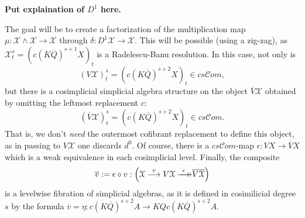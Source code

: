 \documentclass[11pt]{amsart}
\theoremstyle{plain}
\theoremstyle{definition}
\renewcommand{\to}{\longrightarrow}
\newcommand{\scrC}{\mathscr{C}}
\newcommand{\calX}{\mathcal{X}}
\theoremstyle{plain}
\newcommand{\epi}{{\,\makebox[0cm][l]{\ensuremath\to}\to}}
\newcommand{\algs}{{\scrC\!\textit{om}}}
\begin{document}
\begin{Operations on the Bousfield-Kan spectral sequence}
\textbf{Put explaination of $D^1$ here.}

The goal will be to create a factorization of the multiplication map $\mu:\calX \wedge  \calX \to \calX $ through $\delta:D^1\calX \to \calX $. This will be possible (using a zig-zag), as $\calX^s_t=(c(K\overline{Q})^{s+1}X)_t$ is a  Radelescu-Banu resolution. In this case, not only is
\[(V\calX)^s_t=(c(K\overline{Q})^{s+2}X)_t\in cs\algs,\]
but there is a cosimplicial simplicial algebra structure on the object $\overline{V}\calX$ obtained by omitting the leftmost replacement $c$:
\[(\overline{V}\calX)^s_t=(c(K\overline{Q})^{s+2}X)_t\in cs\algs.\]
That is, we don't \emph{need} the outermost cofibrant replacement to define this object, as in passing to $V\calX$ one discards $d^0$. Of course, there is a $cs\algs$-map $\epsilon:VX\to \overline{V}X$ which is a weak equivalence in each cosimplicial level. Finally, the composite
\[\overline{v}:=\epsilon\circ v:\left(\calX\overset{v}{\to}V\calX\overset{\epsilon}{\epi} \overline{V\calX}\right)\]
is a levelwise fibration of simplicial algebras, as it is defined in cosimilicial degree $s$ by the formula $\overline{v}=\eta:c(K\overline{Q})^{s+2}A\to KQc(K\overline{Q})^{s+2}A$. 


\end{Operations on the Bousfield-Kan spectral sequence}
\end{document}
